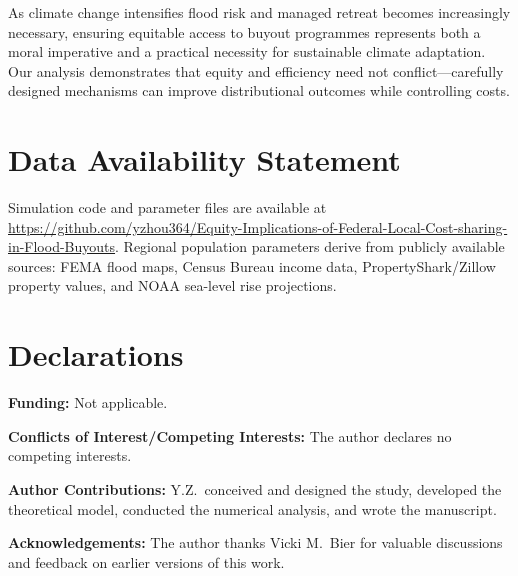 \documentclass[12pt,a4paper]{article}
\begin{document}
As climate change intensifies flood risk and managed retreat becomes increasingly necessary, ensuring equitable access to buyout programmes represents both a moral imperative and a practical necessity for sustainable climate adaptation. Our analysis demonstrates that equity and efficiency need not conflict---carefully designed mechanisms can improve distributional outcomes while controlling costs.


\section*{Data Availability Statement}

Simulation code and parameter files are available at \url{https://github.com/yzhou364/Equity-Implications-of-Federal-Local-Cost-sharing-in-Flood-Buyouts}. Regional population parameters derive from publicly available sources: FEMA flood maps, Census Bureau income data, PropertyShark/Zillow property values, and NOAA sea-level rise projections.


\section*{Declarations}

\textbf{Funding:} Not applicable.

\textbf{Conflicts of Interest/Competing Interests:} The author declares no competing interests.

\textbf{Author Contributions:} Y.Z.\ conceived and designed the study, developed the theoretical model, conducted the numerical analysis, and wrote the manuscript.

\textbf{Acknowledgements:} The author thanks Vicki M.\ Bier for valuable discussions and feedback on earlier versions of this work.

\end{document}
